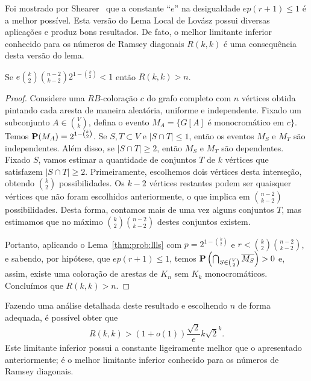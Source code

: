 Foi mostrado por Shearer~\cite{shearer1985problem} que a constante ``$e$'' na desigualdade $ep(r+1) \leq 1$ é a melhor possível. Esta versão do Lema Local de Lovász possui diversas aplicações e produz bons resultados. De fato, o melhor limitante inferior conhecido para os números de Ramsey diagonais $R(k,k)$ é uma consequência desta versão do lema.

\begin{theorem}
\label{thm:prob:ramseylll}
Se $\displaystyle e \binom{k}{2}\binom{n-2}{k-2} 2^{1 - \binom{k}{2}} < 1$ então $R(k,k) > n$.
\end{theorem}
\begin{proof}
Considere uma $RB$-coloração $c$ do grafo completo com $n$ vértices obtida pintando cada aresta de maneira aleatória, uniforme e independente. Fixado um subconjunto $A \in \binom{V}{k}$, defina o evento $M_A = \{G[A] \text{ é monocromático em } c\}$. Temos $\operatorname{\mathbf{P}}(M_A) = 2^{1- \binom{k}{2}}$. Se $S, T \subset V$ e $|S \cap T| \leq 1$, então os eventos $M_S$ e $M_T$ são independentes.
Além disso, se $|S \cap T| \geq 2$, então $M_S$ e $M_T$ são dependentes. Fixado $S$, vamos estimar a quantidade de conjuntos $T$ de $k$ vértices que satisfazem $|S \cap T| \geq 2$. Primeiramente, escolhemos dois vértices desta interseção, obtendo $\binom{k}{2}$ possibilidades. Os $k-2$ vértices restantes podem ser quaisquer vértices que não foram escolhidos anteriormente, o que implica em $\binom{n-2}{k-2}$ possibilidades. Desta forma, contamos mais de uma vez alguns conjuntos $T$, mas estimamos que no máximo $\binom{k}{2}\binom{n-2}{k-2}$ destes conjuntos existem.

Portanto, aplicando o Lema~\ref{thm:prob:llls} com $p = 2^{1 - \binom{k}{2}}$ e $r < \binom{k}{2}\binom{n-2}{k-2}$, e sabendo, por hipótese, que $ep(r+1) \leq 1$,
temos $\operatorname{\mathbf{P}} \left( \bigcap_{S \in \binom{V}{2}} \overline{M_S} \right) > 0$ e, assim, existe uma coloração de arestas de $K_n$ sem $K_k$ monocromáticos. Concluímos que $R(k,k) > n$.
\end{proof}

Fazendo uma análise detalhada deste resultado e escolhendo $n$ de forma adequada, é possível obter que
\[R(k,k) > (1+o(1))\frac{\sqrt{2}}{e}k\sqrt{2}^k.\]
Este limitante inferior possui a constante ligeiramente melhor que o apresentado anteriormente; é o melhor limitante inferior conhecido para os números de Ramsey diagonais.

